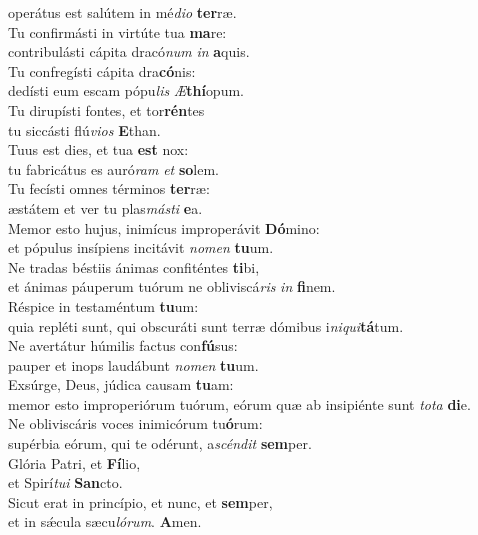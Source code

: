 \oddverse operátus est salútem in mé\textit{di}\textit{o} \textbf{ter}ræ.\\
\evenverse Tu confirmásti in virtúte tua \textbf{ma}re:~\*\\
\evenverse contribulásti cápita dracó\textit{num} \textit{in} \textbf{a}quis.\\
\oddverse Tu confregísti cápita dra\textbf{có}nis:~\*\\
\oddverse dedísti eum escam pópu\textit{lis} \textit{Æ}\textbf{thí}opum.\\
\evenverse Tu dirupísti fontes, et tor\textbf{rén}tes~\*\\
\evenverse tu siccásti flú\textit{vi}\textit{os} \textbf{E}than.\\
\oddverse Tuus est dies, et tua \textbf{est} nox:~\*\\
\oddverse tu fabricátus es auró\textit{ram} \textit{et} \textbf{so}lem.\\
\evenverse Tu fecísti omnes términos \textbf{ter}ræ:~\*\\
\evenverse æstátem et ver tu plas\textit{má}\textit{sti} \textbf{e}a.\\
\oddverse Memor esto hujus, inimícus improperávit \textbf{Dó}mino:~\*\\
\oddverse et pópulus insípiens incitávit \textit{no}\textit{men} \textbf{tu}um.\\
\evenverse Ne tradas béstiis ánimas confiténtes \textbf{ti}bi,~\*\\
\evenverse et ánimas páuperum tuórum ne obliviscá\textit{ris} \textit{in} \textbf{fi}nem.\\
\oddverse Réspice in testaméntum \textbf{tu}um:~\*\\
\oddverse quia repléti sunt, qui obscuráti sunt terræ dómibus i\textit{ni}\textit{qui}\textbf{tá}tum.\\
\evenverse Ne avertátur húmilis factus con\textbf{fú}sus:~\*\\
\evenverse pauper et inops laudábunt \textit{no}\textit{men} \textbf{tu}um.\\
\oddverse Exsúrge, Deus, júdica causam \textbf{tu}am:~\*\\
\oddverse memor esto improperiórum tuórum, eórum quæ ab insipiénte sunt \textit{to}\textit{ta} \textbf{di}e.\\
\evenverse Ne obliviscáris voces inimicórum tu\textbf{ó}rum:~\*\\
\evenverse supérbia eórum, qui te odérunt, a\textit{scén}\textit{dit} \textbf{sem}per.\\
\oddverse Glória Patri, et \textbf{Fí}lio,~\*\\
\oddverse et Spirí\textit{tu}\textit{i} \textbf{San}cto.\\
\evenverse Sicut erat in princípio, et nunc, et \textbf{sem}per,~\*\\
\evenverse et in sǽcula sæcu\textit{ló}\textit{rum}. \textbf{A}men.\\
